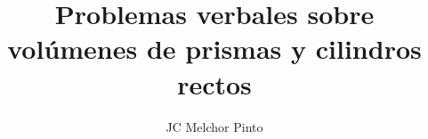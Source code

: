 \documentclass[12pt,addpoints,answers]{guia}
\title{Problemas verbales sobre volúmenes de prismas y cilindros rectos}
\author{JC Melchor Pinto}
\begin{document}
\INFO%
\begin{multicols}{2}
    
    
    
\end{multicols}
\begin{questions}
    \questionboxed[10]{}
    \questionboxed[15]{}
    \questionboxed[10]{}
    \questionboxed[10]{}
    \questionboxed[15]{}
    \questionboxed[10]{}
    \questionboxed[10]{}
    \questionboxed[10]{}
    \questionboxed[10]{}
\end{questions}
\end{document}
